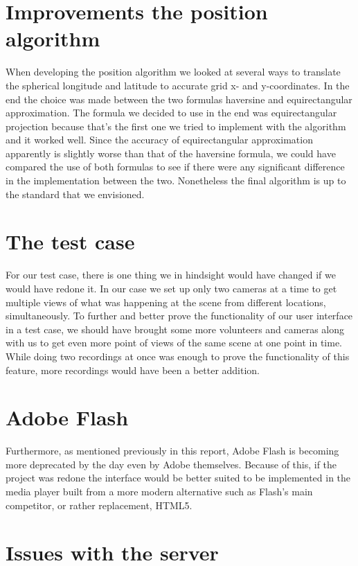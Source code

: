 \section{Improvements the position algorithm}
\label{sec:posimp}

When developing the position algorithm we looked at several ways to translate the spherical longitude and latitude to accurate grid x- and y-coordinates. In the end the choice was made between the two formulas haversine and equirectangular approximation. The formula we decided to use in the end was equirectangular projection because that’s the first one we tried to implement with the algorithm and it worked well. Since the accuracy of equirectangular approximation apparently is slightly worse than that of the haversine formula, we could have compared the use of both formulas to see if there were any significant difference in the implementation between the two. Nonetheless the final algorithm is up to the standard that we envisioned. 

\section{The test case}
\label{sec:test case}

For our test case, there is one thing we in hindsight would have changed if we would have redone it. In our case we set up only two cameras at a time to get multiple views of what was happening at the scene from different locations, simultaneously. To further and better prove the functionality of our user interface in a test case, we should have brought some more volunteers and cameras along with us to get even more point of views of the same scene at one point in time. While doing two recordings at once was enough to prove the functionality of this feature, more recordings would have been a better addition. 

\section{Adobe Flash}
\label{sec:adobe flash}

Furthermore, as mentioned previously in this report, Adobe Flash is becoming more deprecated by the day even by Adobe themselves. Because of this, if the project was redone the interface would be better suited to be implemented in the media player built from a more modern alternative such as Flash’s main competitor, or rather replacement, HTML5.

\section{Issues with the server}
\label{sec:serverissues}

